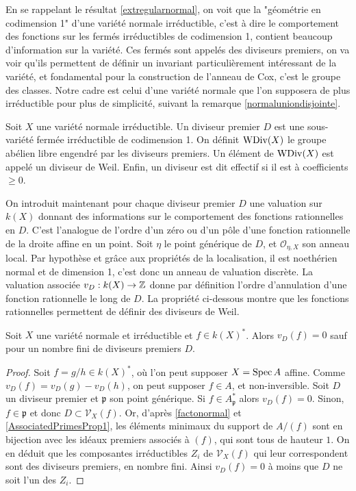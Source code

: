 En se rappelant le résultat \ref{extregularnormal}, on voit que la "géométrie en codimension 1" d'une variété normale irréductible, c'est à dire le comportement des fonctions sur les fermés irréductibles de codimension 1, contient beaucoup d'information sur la variété. Ces fermés sont appelés des diviseurs premiers, on va voir qu'ils permettent de définir un invariant particulièrement intéressant de la variété, et fondamental pour la construction de l'anneau de Cox, c'est le groupe des classes. Notre cadre est celui d'une variété normale que l'on supposera de plus irréductible pour plus de simplicité, suivant la remarque \ref{normaluniondisjointe}.

\begin{defn}
Soit $X$ une variété normale irréductible. Un diviseur premier $D$ est une sous-variété fermée irréductible de codimension 1. On définit $\operatorname{WDiv}(X)$ le groupe abélien libre engendré par les diviseurs premiers. Un élément de $\operatorname{WDiv}(X)$ est appelé un diviseur de Weil. Enfin, un diviseur est dit effectif si il est à coefficients $\geq 0$. 
\end{defn}
On introduit maintenant pour chaque diviseur premier $D$ une valuation sur $k(X)$ donnant des informations sur le comportement des fonctions rationnelles en $D$. C'est l'analogue de l'ordre d'un zéro ou d'un pôle d'une fonction rationnelle de la droite affine en un point. Soit $\eta$ le point générique de $D$, et $\mathcal{O}_{\eta,X}$ son anneau local. Par hypothèse et grâce aux propriétés de la localisation, il est noethérien normal et de dimension 1, c'est donc un anneau de valuation discrète. La valuation associée $v_D:k(X)\rightarrow \mathbb{Z}$ donne par définition l'ordre d'annulation d'une fonction rationnelle le long de $D$. La propriété ci-dessous montre que les fonctions rationnelles permettent de définir des diviseurs de Weil.

\begin{prop}\label{noetherienPWDivBienDef}
Soit $X$ une variété normale et irréductible et $f\in k(X)^*$. Alors $v_D(f)=0$ sauf pour un nombre fini de diviseurs premiers $D$.
\end{prop}
\begin{proof}
Soit $f=g/h\in k(X)^*$, où l'on peut supposer $X=\operatorname{Spec} A$ affine. Comme $v_D(f)=v_D(g)-v_D(h)$, on peut supposer $f\in A$, et non-inversible. Soit $D$ un diviseur premier et $\mathfrak{p}$ son point générique. Si $f\in A_\mathfrak{p}^*$ alors $v_D(f)=0$. Sinon, $f\in \mathfrak{p}$ et donc $D \subset \mathcal{V}_X(f)$. Or, d'après \ref{factonormal} et \ref{AssociatedPrimesProp1}, les éléments minimaux du support de $A/(f)$ sont en bijection avec les idéaux premiers associés à $(f)$, qui sont tous de hauteur $1$. On en déduit que les composantes irréductibles $Z_i$ de $\mathcal{V}_X(f)$ qui leur correspondent sont des diviseurs premiers, en nombre fini. Ainsi $v_D(f)=0$ à moins que $D$ ne soit l'un des $Z_i$.
\end{proof}

